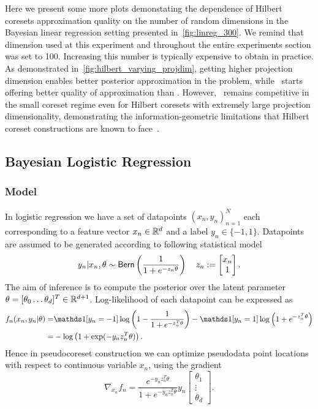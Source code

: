 Here we present some more plots demonstating the dependence of Hilbert coresets approximation quality on the number of random dimensions in the Bayesian linear regression setting presented in~\cref{fig:linreg_300}. We remind that dimension used at this experiment and throughout the entire experiments section was set to 100. Increasing this number is typically expensive to obtain in practice. As demonstrated in~\cref{fig:hilbert_varying_projdim}, getting higher projection dimension enables better posterior approximation in the problem, while \gigao~starts offering better quality of approximation than \gigar. However, \psvi~remains competitive in the small coreset regime even for Hilbert coresets with extremely large projection dimensionality, demonstrating the information-geometric limitations that Hilbert coreset constructions are known to face~\cite{campbell19neurips}.



\subsection{Bayesian Logistic Regression}
\label{supp:logreg_experiment_appendix}


\subsubsection{Model}
\label{supp:logreg_model_appendix}
In logistic regression we have a set of datapoints $(x_n, y_n)_{n=1}^{N}$ each corresponding to a feature vector ${x_n \in \mathbb{R}^d}$ and a label ${y_n \in \{-1, 1\}}$. Datapoints are assumed to be generated according to following statistical model
\[
y_n | x_n, \theta \sim {\sf{Bern}} \left( \frac{1}{1+e^{-z_n \theta}} \right) 
\quad 
z_n := \begin{bmatrix}
x_n \\
1
\end{bmatrix}.
\label{eq:logreg-model}
\]
The aim of inference is to compute the posterior over the latent parameter $ \theta = [\theta_0 \ldots \theta_d]^T \in \mathbb{R}^{d+1}$.
Log-likelihood of each datapoint can be expressed as
\[
\begin{split}
f_n(x_n, y_n|\theta)  
=&\ind{[y_n=-1]}\log \left( 1 - \frac{1}{1+e^{-z_n^T \theta}}\right) 
- \ind{[y_n=1]} \log \left( 1+ e^{-z_n^T \theta}  \right) \\
=&-\log\left( 1 + \exp(-y_n z_n^T\theta)\right).
\label{eq:logreg-loglik}
\end{split}
\]
Hence in pseudocoreset construction we can optimize pseudodata point locations with respect to continuous variable $ x_n$, using the gradient
\[
\nabla_{x_n}f_n =  \frac{e^{-y_n z_n^T \theta}}{1+e^{-y_n z_n^T \theta}}y_n \begin{bmatrix}
\theta_1 \\
\vdots \\
\theta_d
\end{bmatrix}.
\label{eq:logreg-loglik-locgrad}
\]



